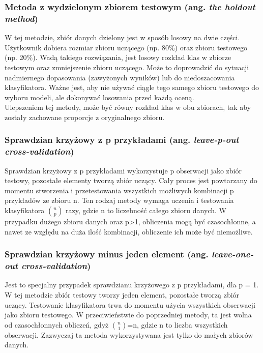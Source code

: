 \subsubsection{Metoda z wydzielonym zbiorem testowym (ang. \textit{the holdout method})}
W tej metodzie, zbiór danych dzielony jest w sposób losowy na dwie części. Użytkownik dobiera rozmiar zbioru uczącego (np. 80\%) oraz zbioru testowego (np. 20\%). Wadą takiego rozwiązania, jest losowy rozkład klas w zbiorze testowym oraz zmniejszenie zbioru uczącego. Może to doprowadzić do sytuacji nadmiernego dopasowania (zawyżonych wyników) lub do niedoszacowania klasyfikatora. Ważne jest, aby nie używać ciągle tego samego zbioru testowego do wyboru modeli, ale dokonywać losowania przed każdą oceną.\\
Ulepszeniem tej metody, może być równy rozkład klas w obu zbiorach, tak aby zostały zachowane proporcje z oryginalnego zbioru.

\subsubsection{Sprawdzian krzyżowy z p przykładami (ang. \textit{leave-p-out cross-validation})}
Sprawdzian krzyżowy z p przykładami wykorzystuje p obserwacji jako zbiór testowy, pozostałe elementy tworzą zbiór uczący. Cały proces jest powtarzany do momentu stworzenia i przetestowania wszystkich możliwych kombinacji p przykładów ze zbioru n. Ten rodzaj metody wymaga uczenia i testowania klasyfikatora $\binom{n}{p}$ razy, gdzie n to liczebność całego zbioru danych. W przypadku dużego zbioru danych oraz p>1, obliczenia mogą być czasochłonne, a nawet ze względu na duża ilość kombinacji, obliczenie ich może być niemożliwe.

\subsubsection{Sprawdzian krzyżowy minus jeden element (ang. \textit{leave-one-out cross-validation})}
Jest to specjalny przypadek sprawdzianu krzyżowego z p przykładami, dla p = 1. W tej metodzie zbiór testowy tworzy jeden element, pozostałe tworzą zbiór uczący. Testowanie klasyfikatora trwa do momentu użycia wszystkich obserwacji jako zbioru testowego. W przeciwieństwie do poprzedniej metody, ta jest wolna od czasochłonnych obliczeń, gdyż $\binom{n}{1}$=n, gdzie n to liczba wszystkich obserwacji. Zazwyczaj ta metoda wykorzystywana jest tylko do małych zbiorów danych.

